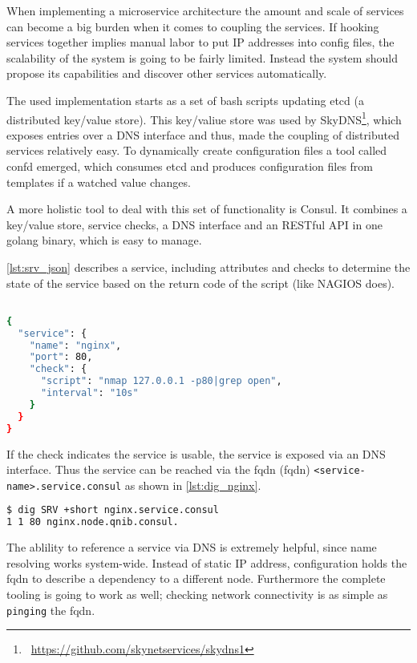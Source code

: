 When implementing a microservice architecture the amount and scale of services can become a big burden when it comes to coupling the services.
If hooking services together implies manual labor to put IP addresses into config files, the scalability of the system is going to be fairly limited.
Instead the system should propose its capabilities and discover other services automatically.

The used implementation starts as a set of bash scripts updating etcd (a distributed key/value store). This key/valiue store was used by SkyDNS\footnote{\Mundus~\url{https://github.com/skynetservices/skydns1}}, which exposes entries
over a DNS interface and thus, made the coupling of distributed services relatively easy. To dynamically create configuration files a tool called confd emerged, which consumes
etcd and produces configuration files from templates if a watched value changes.

A more holistic tool to deal with this set of functionality is Consul. It combines a key/value store, service checks, a DNS interface and an RESTful API
in one golang binary, which is easy to manage.

\autoref{lst:srv_json} describes a service, including attributes and checks to determine the state of the service based on the return code of the script (like NAGIOS does). 

\begin{lstlisting}[language=bash,
    caption={Service definition within consul. If the keyword open is not find within the nmap output the service is marked WARNING},
    label={lst:srv_json}]

{
  "service": {
    "name": "nginx",
    "port": 80,
    "check": {
      "script": "nmap 127.0.0.1 -p80|grep open",
      "interval": "10s"
    }
  }
}
\end{lstlisting}

If the check indicates the service is usable, the service is exposed via an DNS interface.
Thus the service can be reached via the \gls{fqdn} (\glsdesc{fqdn}) \lstinline{<service-name>.service.consul} as shown in \autoref{lst:dig_nginx}.
\begin{lstlisting}[language=bash,
    caption={Exposure of services via DNS.},
    label={lst:dig_nginx}]
$ dig SRV +short nginx.service.consul
1 1 80 nginx.node.qnib.consul.
\end{lstlisting}

The ablility to reference a service via DNS is extremely helpful, since name resolving works system-wide. Instead of static IP address,
configuration holds the \gls{fqdn} to describe a dependency to a different node. Furthermore the complete tooling is going to work as well; checking network connectivity is as
simple as \lstinline{pinging} the \gls{fqdn}.

